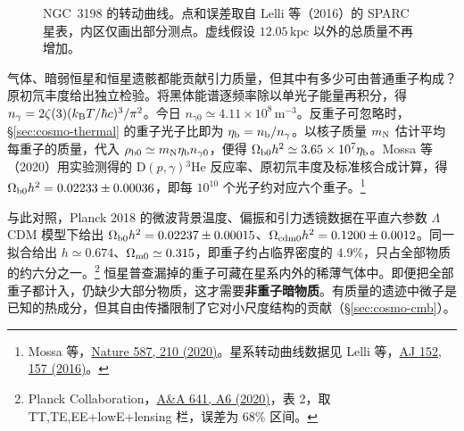 \begin{figure}[htbp]
\centering
{}
\caption{NGC~3198 的转动曲线。点和误差取自 Lelli 等（2016）的 SPARC 星表，内区仅画出部分测点。虚线假设 $12.05\,\mathrm{kpc}$ 以外的总质量不再增加。}\label{fig:cosmo-rotation}
\end{figure}

气体、暗弱恒星和恒星遗骸都能贡献引力质量，但其中有多少可由普通重子构成？原初氘丰度给出独立检验。将黑体能谱逐频率除以单光子能量再积分，得 $n_\gamma=2\zeta(3)(k_{\rm B}T/\hbar c)^3/\pi^2$。今日 $n_{\gamma0}\simeq4.11\times10^8\,\mathrm{m^{-3}}$。反重子可忽略时，\S\ref{sec:cosmo-thermal} 的重子光子比即为 $\eta_{\rm b}=n_{\rm b}/n_\gamma$。以核子质量 $m_{\rm N}$ 估计平均每重子的质量，代入 $\rho_{\rm b0}\simeq m_{\rm N}\eta_{\rm b}n_{\gamma0}$，便得 $\Omega_{\rm b0}h^2\simeq3.65\times10^7\eta_{\rm b}$。Mossa 等（2020）用实验测得的 $\mathrm D(p,\gamma){}^3\mathrm{He}$ 反应率、原初氘丰度及标准核合成计算，得 $\Omega_{\rm b0}h^2=0.02233\pm0.00036$，即每 $10^{10}$ 个光子约对应六个重子。\nobreak\footnote{Mossa 等，\href{https://doi.org/10.1038/s41586-020-2878-4}{Nature 587, 210 (2020)}。星系转动曲线数据见 Lelli 等，\href{https://arxiv.org/abs/1606.09251}{AJ 152, 157 (2016)}。}

与此对照，Planck 2018 的微波背景温度、偏振和引力透镜数据在平直六参数 $\Lambda$CDM 模型下给出 $\Omega_{\rm b0}h^2=0.02237\pm0.00015$、$\Omega_{\rm cdm0}h^2=0.1200\pm0.0012$。同一拟合给出 $h\simeq0.674$、$\Omega_{\rm m0}\simeq0.315$，即重子约占临界密度的 $4.9\%$，只占全部物质的约六分之一。\footnote{Planck Collaboration，\href{https://doi.org/10.1051/0004-6361/201833910}{A\&A 641, A6 (2020)}，表 2，取 TT,TE,EE+lowE+lensing 栏，误差为 $68\%$ 区间。} 恒星普查漏掉的重子可藏在星系内外的稀薄气体中。即便把全部重子都计入，仍缺少大部分物质，这才需要\textbf{非重子暗物质}。有质量的遗迹中微子是已知的热成分，但其自由传播限制了它对小尺度结构的贡献（\S\ref{sec:cosmo-cmb}）。

